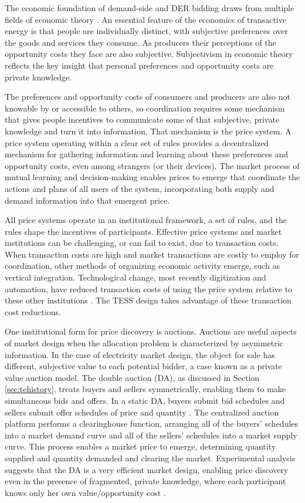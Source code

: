 The economic foundation of demand-side and DER bidding draws from multiple fields of economic theory \citep{kiesling_2021}. An essential feature of the economics of transactive energy is that people are individually distinct, with subjective preferences over the goods and services they consume. As producers their perceptions of the opportunity costs they face are also subjective. Subjectivism in economic theory reflects the key insight that personal preferences and opportunity costs are private knowledge.

The preferences and opportunity costs of consumers and producers are also not knowable by or accessible to others, so coordination requires some mechanism that gives people incentives to communicate some of that subjective, private knowledge and turn it into information. That mechanism is the price system. A price system operating within a clear set of rules provides a decentralized mechanism for gathering information and learning about these preferences and opportunity costs, even among strangers (or their devices). The market process of mutual learning and decision-making enables prices to emerge that coordinate the actions and plans of all users of the system, incorporating both supply and demand information into that emergent price.

All price systems operate in an institutional framework, a set of rules, and the rules shape the incentives of participants. Effective price systems and market institutions can be challenging, or can fail to exist, due to transaction costs. When transaction costs are high and market transactions are costly to employ for coordination, other methods of organizing economic activity emerge, such as vertical integration. Technological change, most recently digitization and automation, have reduced transaction costs of using the price system relative to these other institutions \citep{kiesling_2016}. The TESS design takes advantage of these transaction cost reductions.

One institutional form for price discovery is auctions. Auctions are useful aspects of market design when the allocation problem is characterized by asymmetric information. In the case of electricity market design, the object for sale has different, subjective value to each potential bidder, a case known as a private value auction model. The double auction (DA), as discussed in Section \ref{sec:tehistory}, treats buyers and sellers symmetrically, enabling them to make simultaneous bids and offers. In a static DA, buyers submit bid schedules and sellers submit offer schedules of price and quantity \citep{friedman1993double}. The centralized auction platform performs a clearinghouse function, arranging all of the buyers’ schedules into a market demand curve and all of the sellers’ schedules into a market supply curve. This process enables a market price to emerge, determining quantity supplied and quantity demanded and clearing the market. Experimental analysis suggests that the DA is a very efficient market design, enabling price discovery even in the presence of fragmented, private knowledge, where each participant knows only her own value/opportunity cost \citep{easley1993theories}.

